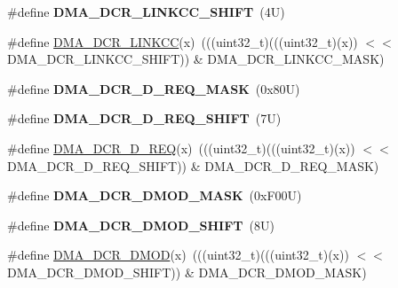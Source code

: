 \begin{DoxyCompactItemize}
\#define {\bfseries D\+M\+A\+\_\+\+D\+C\+R\+\_\+\+L\+I\+N\+K\+C\+C\+\_\+\+S\+H\+I\+FT}~(4\+U)
\item 
\#define \mbox{\hyperlink{group___d_m_a___register___masks_gad9c5a682d0096224948bdc2e887a4bc3}{D\+M\+A\+\_\+\+D\+C\+R\+\_\+\+L\+I\+N\+K\+CC}}(x)~(((uint32\+\_\+t)(((uint32\+\_\+t)(x)) $<$$<$ D\+M\+A\+\_\+\+D\+C\+R\+\_\+\+L\+I\+N\+K\+C\+C\+\_\+\+S\+H\+I\+FT)) \& D\+M\+A\+\_\+\+D\+C\+R\+\_\+\+L\+I\+N\+K\+C\+C\+\_\+\+M\+A\+SK)
\item 
\mbox{\label{group___d_m_a___register___masks_ga8ac0ee4daba5e6b55e3dacf8850c6d85}} 
\#define {\bfseries D\+M\+A\+\_\+\+D\+C\+R\+\_\+\+D\+\_\+\+R\+E\+Q\+\_\+\+M\+A\+SK}~(0x80\+U)
\item 
\mbox{\label{group___d_m_a___register___masks_ga9d98a83ee41a26845e41b7cd8917479a}} 
\#define {\bfseries D\+M\+A\+\_\+\+D\+C\+R\+\_\+\+D\+\_\+\+R\+E\+Q\+\_\+\+S\+H\+I\+FT}~(7\+U)
\item 
\#define \mbox{\hyperlink{group___d_m_a___register___masks_ga476c8df5ed90b6fcb6a965e58d15c979}{D\+M\+A\+\_\+\+D\+C\+R\+\_\+\+D\+\_\+\+R\+EQ}}(x)~(((uint32\+\_\+t)(((uint32\+\_\+t)(x)) $<$$<$ D\+M\+A\+\_\+\+D\+C\+R\+\_\+\+D\+\_\+\+R\+E\+Q\+\_\+\+S\+H\+I\+FT)) \& D\+M\+A\+\_\+\+D\+C\+R\+\_\+\+D\+\_\+\+R\+E\+Q\+\_\+\+M\+A\+SK)
\item 
\mbox{\label{group___d_m_a___register___masks_ga0d30381585aa7d7a13a3b5d349187781}} 
\#define {\bfseries D\+M\+A\+\_\+\+D\+C\+R\+\_\+\+D\+M\+O\+D\+\_\+\+M\+A\+SK}~(0x\+F00\+U)
\item 
\mbox{\label{group___d_m_a___register___masks_ga83936f94b10ed7a680004a898274875c}} 
\#define {\bfseries D\+M\+A\+\_\+\+D\+C\+R\+\_\+\+D\+M\+O\+D\+\_\+\+S\+H\+I\+FT}~(8\+U)
\item 
\#define \mbox{\hyperlink{group___d_m_a___register___masks_gabb9c13671b43c6561c6ee77e0158665d}{D\+M\+A\+\_\+\+D\+C\+R\+\_\+\+D\+M\+OD}}(x)~(((uint32\+\_\+t)(((uint32\+\_\+t)(x)) $<$$<$ D\+M\+A\+\_\+\+D\+C\+R\+\_\+\+D\+M\+O\+D\+\_\+\+S\+H\+I\+FT)) \& D\+M\+A\+\_\+\+D\+C\+R\+\_\+\+D\+M\+O\+D\+\_\+\+M\+A\+SK)
\item 
\mbox{\label{group___d_m_a___register___masks_gac1240160400703410f467f172117850f}} 
$$
\end{DoxyCompactItemize}
